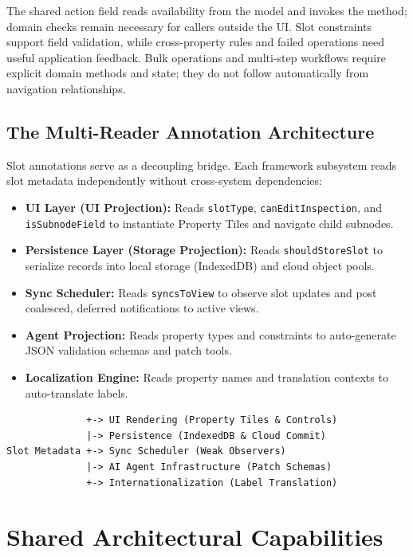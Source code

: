 \documentclass[sigplan,review,anonymous,10pt]{acmart}
\begin{document}
The shared action field reads availability from the model and invokes the method; domain checks remain necessary for callers outside the UI. Slot constraints support field validation, while cross-property rules and failed operations need useful application feedback. Bulk operations and multi-step workflows require explicit domain methods and state; they do not follow automatically from navigation relationships.

\subsection{The Multi-Reader Annotation Architecture}

Slot annotations serve as a decoupling bridge. Each framework subsystem reads slot metadata independently without cross-system dependencies:

\begin{itemize}
\item \textbf{UI Layer (UI Projection):} Reads \texttt{slotType}, \texttt{canEditInspection}, and \texttt{isSubnodeField} to instantiate Property Tiles and navigate child subnodes.
\item \textbf{Persistence Layer (Storage Projection):} Reads \texttt{shouldStoreSlot} to serialize records into local storage (IndexedDB) and cloud object pools.
\item \textbf{Sync Scheduler:} Reads \texttt{syncsToView} to observe slot updates and post coalesced, deferred notifications to active views.
\item \textbf{Agent Projection:} Reads property types and constraints to auto-generate JSON validation schemas and patch tools.
\item \textbf{Localization Engine:} Reads property names and translation contexts to auto-translate labels.
\end{itemize}

\begin{small}
\begin{verbatim}
              +-> UI Rendering (Property Tiles & Controls)
              |-> Persistence (IndexedDB & Cloud Commit)
Slot Metadata +-> Sync Scheduler (Weak Observers)
              |-> AI Agent Infrastructure (Patch Schemas)
              +-> Internationalization (Label Translation)
\end{verbatim}
\end{small}

\section{Shared Architectural Capabilities}
\label{sec:consequences}
\end{document}
